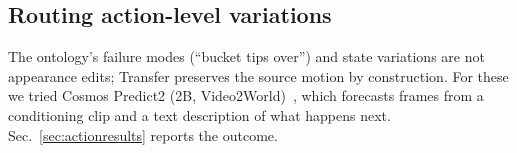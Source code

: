 \subsection{Routing action-level variations}
\label{sec:action}
The ontology's failure modes (``bucket tips over'') and state variations are not appearance edits; Transfer preserves the source motion by construction. For these we tried Cosmos Predict2 (2B, Video2World)~\cite{cosmospredict2}, which forecasts frames from a conditioning clip and a text description of what happens next. Sec.~\ref{sec:actionresults} reports the outcome.
